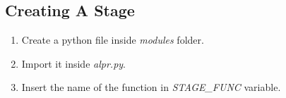 \subsection{Creating A Stage}
\begin{enumerate}
    \item Create a python file inside {\it modules} folder. 
    \item Import it inside {\it alpr.py}.
    \item Insert the name of the function in {\it STAGE\_FUNC} variable.
\end{enumerate}

